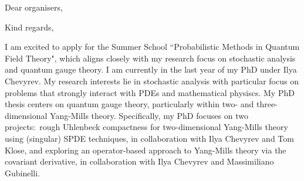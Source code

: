 \documentclass[12pt,a4paper]{moderncv}
\begin{document}
\date{\today}
\opening{Dear organisers,}
\closing{Kind regards,\vspace{0em}}


\makelettertitle
\justifying

I am excited to apply for the Summer School ``Probabilistic Methods in Quantum Field Theory", which aligns closely with my research focus on stochastic analysis and quantum gauge theory. I am currently in the last year of my PhD  under Ilya Chevyrev. 
%
%
My research interests lie in stochastic analysis with particular focus on problems  that strongly interact with PDEs and mathematical physiscs. 
%
%
My PhD thesis centers on quantum gauge theory, particularly within two- and three-dimensional Yang-Mills theory. Specifically, my PhD focuses on two projects:\ rough Uhlenbeck compactness for two-dimensional Yang-Mills theory using (singular) SPDE techniques, in collaboration with  Ilya Chevyrev and Tom Klose, and exploring an operator-based approach to Yang-Mills theory via the covariant derivative, in collaboration with Ilya Chevyrev and Massimiliano Gubinelli. 
\end{document}
